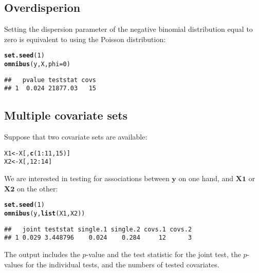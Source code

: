 \documentclass{article}\usepackage[]{graphicx}\usepackage[]{color}
\makeatletter
\newcommand{\hlnum}[1]{\textcolor[rgb]{0.686,0.059,0.569}{#1}}%
\newcommand{\hlopt}[1]{\textcolor[rgb]{0,0,0}{#1}}%
\newcommand{\hlstd}[1]{\textcolor[rgb]{0.345,0.345,0.345}{#1}}%
\newcommand{\hlkwb}[1]{\textcolor[rgb]{0.69,0.353,0.396}{#1}}%
\newcommand{\hlkwc}[1]{\textcolor[rgb]{0.333,0.667,0.333}{#1}}%
\newcommand{\hlkwd}[1]{\textcolor[rgb]{0.737,0.353,0.396}{\textbf{#1}}}%
\newenvironment{kframe}{%
 \def\at@end@of@kframe{}%
 \ifinner\ifhmode%
  \def\at@end@of@kframe{\end{minipage}}%
  \begin{minipage}{\columnwidth}%
 \fi\fi%
 \def\FrameCommand##1{\hskip\@totalleftmargin \hskip-\fboxsep
 \colorbox{shadecolor}{##1}\hskip-\fboxsep
     \hskip-\linewidth \hskip-\@totalleftmargin \hskip\columnwidth}%
 \MakeFramed {\advance\hsize-\width
   \@totalleftmargin\z@ \linewidth\hsize
   \@setminipage}}%
 {\par\unskip\endMakeFramed%
 \at@end@of@kframe}
\newenvironment{knitrout}{}{} %
\makeatother
\begin{document}
\newpage

\subsection{Overdisperion}
\label{TOA Overdispersion}

Setting the dispersion parameter of the negative binomial distribution equal to zero is equivalent to using the Poisson distribution:
\begin{knitrout}
\color{fgcolor}\begin{kframe}
\begin{alltt}
\hlkwd{set.seed}\hlstd{(}\hlnum{1}\hlstd{)}
\hlkwd{omnibus}\hlstd{(y,X,}\hlkwc{phi}\hlstd{=}\hlnum{0}\hlstd{)}
\end{alltt}
\begin{verbatim}
##   pvalue teststat covs
## 1  0.024 21877.03   15
\end{verbatim}
\end{kframe}
\end{knitrout}

\subsection{Multiple covariate sets}
\label{TOA Multiple covariate sets}

Suppose that two covariate sets are available:
\begin{knitrout}
\color{fgcolor}\begin{kframe}
\begin{alltt}
\hlstd{X1} \hlkwb{<-} \hlstd{X[,}\hlkwd{c}\hlstd{(}\hlnum{1}\hlopt{:}\hlnum{11}\hlstd{,}\hlnum{15}\hlstd{)]}
\hlstd{X2} \hlkwb{<-} \hlstd{X[,}\hlnum{12}\hlopt{:}\hlnum{14}\hlstd{]}
\end{alltt}
\end{kframe}
\end{knitrout}

We are interested in testing for associations between $\boldsymbol{y}$ on one hand, and $\boldsymbol{X1}$ or $\boldsymbol{X2}$ on the other:
\begin{knitrout}
\color{fgcolor}\begin{kframe}
\begin{alltt}
\hlkwd{set.seed}\hlstd{(}\hlnum{1}\hlstd{)}
\hlkwd{omnibus}\hlstd{(y,}\hlkwd{list}\hlstd{(X1,X2))}
\end{alltt}
\begin{verbatim}
##   joint teststat single.1 single.2 covs.1 covs.2
## 1 0.029 3.448796    0.024    0.284     12      3
\end{verbatim}
\end{kframe}
\end{knitrout}
The output includes the \mbox{$p$-value} and the test statistic for the joint test, the \mbox{$p$-values} for the individual tests, and the numbers of tested covariates.
\end{document}
